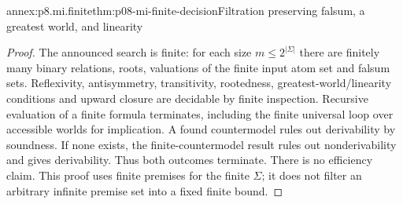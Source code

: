 \begin{annexitem}{annex:p8.mi.finite}{thm:p08-mi-finite-decision}{Filtration preserving falsum, a greatest world, and linearity}
\begin{proof}
The announced search is finite: for each size \(m\leq2^{|\Sigma|}\)
there are finitely many binary relations, roots, valuations of the finite
input atom set and falsum sets. Reflexivity, antisymmetry, transitivity,
rootedness, greatest-world/linearity conditions and upward closure are
decidable by finite inspection. Recursive evaluation of a finite formula
terminates, including the finite universal loop over accessible worlds
for implication. A found countermodel rules out derivability by
soundness. If none exists, the finite-countermodel result rules out
nonderivability and gives derivability. Thus both outcomes terminate.
There is no efficiency claim. This proof uses finite premises for the
finite \(\Sigma\); it does not filter an arbitrary infinite premise
set into a fixed finite bound.
\end{proof}
\end{annexitem}

